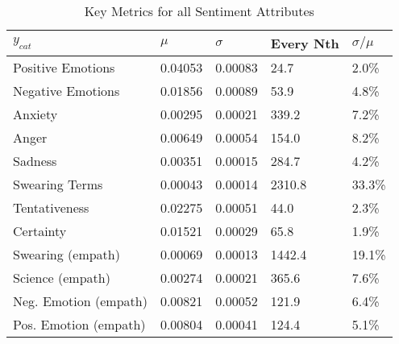 \begin{table}[h]\centering
	\begin{tabular}{lllll}
	\toprule
	$y_{cat}$ &    $\mu$ & $\sigma$ & Every Nth & $\sigma / \mu$ \\
	\midrule
	Positive Emotions     &  0.04053 &  0.00083 &      24.7 &          2.0\% \\
	Negative Emotions     &  0.01856 &  0.00089 &      53.9 &          4.8\% \\
	Anxiety               &  0.00295 &  0.00021 &     339.2 &          7.2\% \\
	Anger                 &  0.00649 &  0.00054 &     154.0 &          8.2\% \\
	Sadness               &  0.00351 &  0.00015 &     284.7 &          4.2\% \\
	Swearing Terms        &  0.00043 &  0.00014 &    2310.8 &         33.3\% \\
	Tentativeness         &  0.02275 &  0.00051 &      44.0 &          2.3\% \\
	Certainty             &  0.01521 &  0.00029 &      65.8 &          1.9\% \\
	Swearing (empath)     &  0.00069 &  0.00013 &    1442.4 &         19.1\% \\
	Science (empath)      &  0.00274 &  0.00021 &     365.6 &          7.6\% \\
	Neg. Emotion (empath) &  0.00821 &  0.00052 &     121.9 &          6.4\% \\
	Pos. Emotion (empath) &  0.00804 &  0.00041 &     124.4 &          5.1\% \\
	\bottomrule
	\end{tabular}
	
\caption{Key Metrics for all Sentiment Attributes}
	\label{fig: mean_std}
\end{table}

